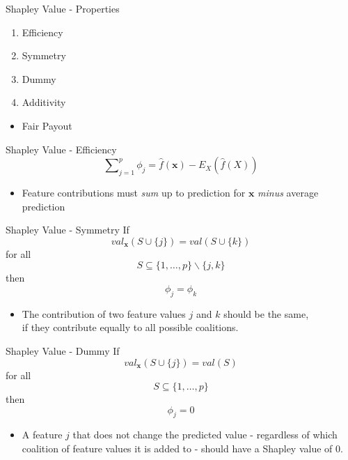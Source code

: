 \begin{frame}{Shapley Value - Properties}
	\begin{enumerate}
		\item Efficiency
		\item Symmetry
		\item Dummy
		\item Additivity
	\end{enumerate}
	\begin{itemize}
		\item Fair Payout
	\end{itemize}
\end{frame}
\begin{frame}{Shapley Value - Efficiency}
	\begin{equation}
		\sum\nolimits_{j=1}^p\phi_j=\hat{f}(\bm{x})-E_X(\hat{f}(X))
	\end{equation}
	\begin{itemize}
		\item Feature contributions must \emph{sum} up to prediction for $\bm{x}$ \emph{minus} average prediction
	\end{itemize}
\end{frame}
\begin{frame}{Shapley Value - Symmetry}
	If
	\begin{equation}
		val_{\bm{x}}(S \cup \{j\})=val(S\cup\{k\})
	\end{equation}
	for all
	\begin{equation*}
		S\subseteq\{1,\ldots, p\} \backslash \{j,k\}
	\end{equation*}
	then
	\begin{equation*}
		\phi_j=\phi_k
	\end{equation*}
	\begin{itemize}
		\item The contribution of two feature values $j$ and $k$ should be the same, 
		\\if they contribute equally to all possible coalitions.
	\end{itemize}
\end{frame}
\begin{frame}{Shapley Value - Dummy}
	If
	\begin{equation}
		val_{\bm{x}}(S\cup\{j\})=val(S)
	\end{equation}
	for all
	\begin{equation*}
		S\subseteq\{1,\ldots,p\}
	\end{equation*}
	then
	\begin{equation*}
		\phi_j=0
	\end{equation*}
	\begin{itemize}
		\item A feature $j$ that does not change the predicted value - regardless of which coalition of feature values it is added to - should have a Shapley value of 0.
	\end{itemize}
\end{frame}
